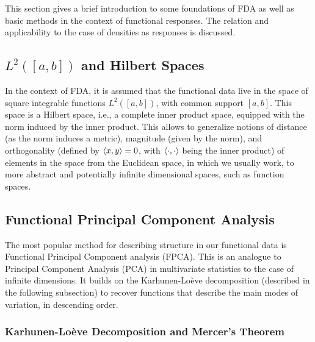 This section gives a brief introduction to some foundations of FDA as well as basic
methods in the context of functional responses. The relation and applicability to the
case of densities as responses is discussed.

\subsection{$L^2([a, b])$ and Hilbert Spaces}
\label{sec:l2 and hilbert spaces}
In the context of FDA, it is assumed that the functional data live in
the space of square integrable functions $L^2([a,b])$, with common
support $[a,b]$. This space is a Hilbert space, i.e., a complete inner
product space, equipped with the norm induced by the inner product.
This allows to generalize notions of distance (as the norm induces a
metric), magnitude (given by the norm), and orthogonality (defined by
$\left \langle x, y \right \rangle = 0$, with $\left \langle \cdot, \cdot \right \rangle$ being the inner product) of elements
in the space from the Euclidean space, in which we usually work, to more
abstract and potentially infinite dimensional spaces, such as function
spaces.

\subsection{Functional Principal Component Analysis}
\label{sec:fpca}
The most popular method for describing structure in our functional data is Functional
Principal Component analysis (FPCA). This is an analogue to Principal Component Analysis
(PCA) in multivariate statistics to the case of infinite dimensions. It builds on the
Karhunen-Loève decomposition (described in the following subsection) to recover functions
that describe the main modes of variation, in descending order.

\subsubsection{Karhunen-Loève Decomposition and Mercer's Theorem}
\label{sec:kh and mercer}
